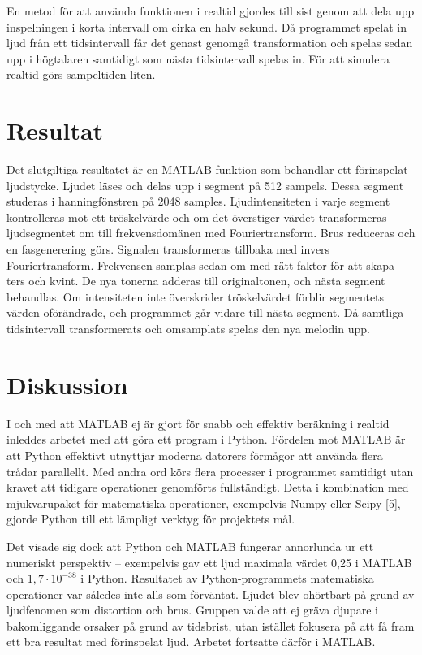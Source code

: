 \documentclass[12pt,a4paper]{article}
\begin{document}
En metod för att använda funktionen i realtid gjordes till sist genom att dela upp inspelningen i korta intervall om cirka en halv sekund. Då programmet spelat in ljud från ett tidsintervall får det genast genomgå transformation och spelas sedan upp i högtalaren samtidigt som nästa tidsintervall spelas in. För att simulera realtid görs sampeltiden liten.

\section{Resultat}

Det slutgiltiga resultatet är en MATLAB-funktion som behandlar ett förinspelat ljudstycke. Ljudet läses och delas upp i segment på 512 sampels. Dessa segment studeras i hanningfönstren på 2048 samples. Ljudintensiteten i varje segment kontrolleras mot ett tröskelvärde och om det överstiger värdet transformeras ljudsegmentet om till frekvensdomänen med Fouriertransform. Brus reduceras och en fasgenerering görs. Signalen transformeras tillbaka med invers Fouriertransform. Frekvensen samplas sedan om med rätt faktor för att skapa ters och kvint. De nya tonerna adderas till originaltonen, och nästa segment behandlas. Om intensiteten inte överskrider tröskelvärdet förblir segmentets värden oförändrade, och programmet går vidare till nästa segment. Då samtliga tidsintervall transformerats och omsamplats spelas den nya melodin upp.

\section{Diskussion}

I och med att MATLAB ej är gjort för snabb och effektiv beräkning i realtid inleddes arbetet med att göra ett program i Python. Fördelen mot MATLAB är att Python effektivt utnyttjar moderna datorers förmågor att använda flera trådar parallellt. Med andra ord körs flera processer i programmet samtidigt utan kravet att tidigare operationer genomförts fullständigt. Detta i kombination med mjukvarupaket för matematiska operationer, exempelvis Numpy eller Scipy [5], gjorde Python till ett lämpligt verktyg för projektets mål.

Det visade sig dock att Python och MATLAB fungerar annorlunda ur ett numeriskt perspektiv – exempelvis gav ett ljud maximala värdet 0,25 i MATLAB och $1,7 \cdot 10^{-38}$ i Python. Resultatet av Python-programmets matematiska operationer var således inte alls som förväntat. Ljudet blev ohörtbart på grund av ljudfenomen som distortion och brus. Gruppen valde att ej gräva djupare i bakomliggande orsaker på grund av tidsbrist, utan istället fokusera på att få fram ett bra resultat med förinspelat ljud. Arbetet fortsatte därför i MATLAB.
\end{document}
